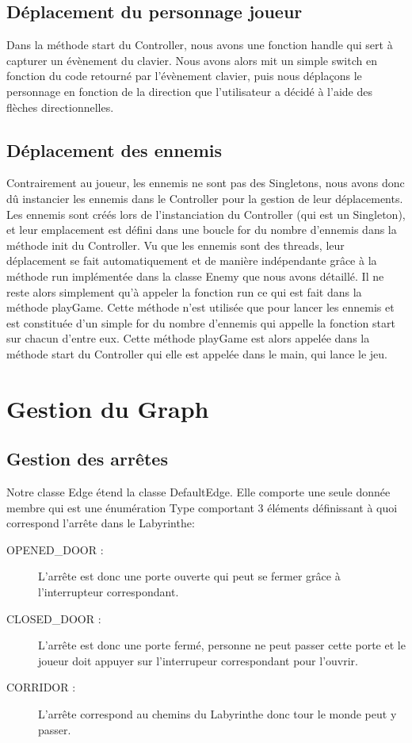 \documentclass [10pt, a4paper]{article}
\begin{document}
\subsection {Déplacement du personnage joueur}
Dans la méthode start du Controller, nous avons une fonction handle qui sert à capturer un évènement du clavier. Nous avons alors mit un simple switch en fonction du code retourné par l'évènement clavier, puis nous déplaçons le personnage en fonction de la direction que l'utilisateur a décidé à l'aide des flèches directionnelles.

\subsection {Déplacement des ennemis}
Contrairement au joueur, les ennemis ne sont pas des Singletons, nous avons donc dû instancier les ennemis dans le Controller pour la gestion de leur déplacements. Les ennemis sont créés lors de l'instanciation du Controller (qui est un Singleton), et leur emplacement est défini dans une boucle for du nombre d'ennemis dans la méthode init du Controller. Vu que les ennemis sont des threads, leur déplacement se fait automatiquement et de manière indépendante grâce à la méthode run implémentée dans la classe Enemy que nous avons détaillé. Il ne reste alors simplement qu'à appeler la fonction run ce qui est fait dans la méthode playGame. Cette méthode n'est utilisée que pour lancer les ennemis et est constituée d'un simple for du nombre d'ennemis qui appelle la fonction start sur chacun d'entre eux. Cette méthode playGame est alors appelée dans la méthode start du Controller qui elle est appelée dans le main, qui lance le jeu.

\section {Gestion du Graph}
\subsection {Gestion des arrêtes}
Notre classe Edge étend la classe DefaultEdge. Elle comporte une seule donnée membre qui est une énumération Type comportant 3 éléments définissant à quoi correspond l'arrête dans le Labyrinthe:
\begin {description}
\item  [OPENED_DOOR :]     L'arrête est donc une porte ouverte qui peut se fermer grâce à l'interrupteur correspondant.
\item  [CLOSED_DOOR :]  L'arrête est donc une porte fermé, personne ne peut passer cette porte et le joueur doit appuyer sur l'interrupeur correspondant pour l'ouvrir.
\item  [CORRIDOR :] L'arrête correspond au chemins du Labyrinthe donc tour le monde peut y passer.
\end   {description}
\end{document}
